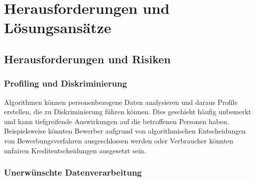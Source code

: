 \chapter{Herausforderungen und Lösungsansätze}


\section{Herausforderungen und Risiken}



\subsection{Profiling und Diskriminierung}

Algorithmen können personenbezogene Daten analysieren und daraus Profile
erstellen, die zu Diskriminierung führen können. Dies geschieht häufig unbemerkt
und kann tiefgreifende Auswirkungen auf die betroffenen Personen haben.
Beispielsweise könnten Bewerber aufgrund von algorithmischen Entscheidungen von
Bewerbungsverfahren ausgeschlossen werden oder Verbraucher könnten unfairen
Kreditentscheidungen ausgesetzt sein. 


\subsection{Unerwünschte Datenverarbeitung}

